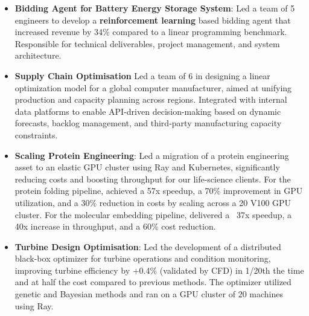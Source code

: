 \documentclass[a4paper]{deedy-resume} %
\begin{document}
\begin{multicols}{2}
    \begin{itemize}
        \item  \textbf{Bidding Agent for Battery Energy Storage System}: Led a team of 5 engineers to develop a \textbf{reinforcement learning} based bidding agent that
              increased revenue by 34\% compared to a linear programming benchmark. Responsible for technical deliverables, project management, and system architecture.
        \item \textbf{Supply Chain Optimisation} Led a team of 6 in designing a linear optimization model for a global computer manufacturer,
              aimed at unifying production and capacity planning across regions. Integrated with internal data platforms to enable API-driven decision-making
              based on dynamic forecasts, backlog management, and third-party manufacturing capacity constraints.
    \end{itemize}
    \columnbreak
    \begin{itemize}
        \item \textbf{Scaling Protein Engineering}: Led a migration of a protein engineering asset to an elastic GPU cluster using Ray and Kubernetes, significantly reducing costs
              and boosting throughput for our life-science clients. For the protein folding pipeline, achieved a 57x speedup, a 70\% improvement in GPU utilization,
              and a 30\% reduction in costs by scaling across a 20 V100 GPU cluster. For the molecular embedding pipeline, delivered a ~37x speedup, a 40x increase in throughput,
              and a 60\% cost reduction.
        \item \textbf{Turbine Design Optimisation}: Led the development of a distributed black-box optimizer for turbine operations and condition monitoring,
              improving turbine efficiency by +0.4\% (validated by CFD) in 1/20th the time and at half the cost compared to previous methods.
              The optimizer utilized genetic and Bayesian methods and ran on a GPU cluster of 20 machines using Ray.
              \columnbreak
    \end{itemize}
\end{multicols}
\end{document}
